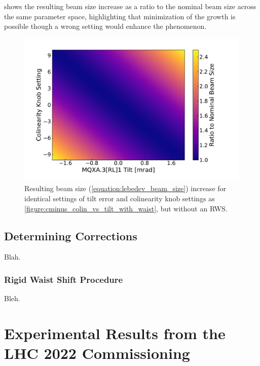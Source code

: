  shows the resulting beam size increase as a ratio to the nominal beam size across the same parameter space, highlighting that minimization of the growth is possible though a wrong setting would enhance the phenomenon.

\begin{figure}[!htb]
    \centering
    \includegraphics*[width=0.99\columnwidth]{Figures/IR_Coupling_Correction/ip_beam_size_growth_colin_tilt_compensation_no_waist.pdf}
    \caption{Resulting beam size (\cref{equation:lebedev_beam_size}) increase for identical settings of tilt error and colinearity knob settings as \cref{figure:cminus_colin_vs_tilt_with_waist}, but without an RWS.}
    \label{figure:beam_size_colin_vs_tilt_no_waist}
\end{figure}

\subsection{Determining Corrections}

Blah.

\subsubsection*{Rigid Waist Shift Procedure}

Bleh.


\section{Experimental Results from the LHC \num{2022} Commissioning}

